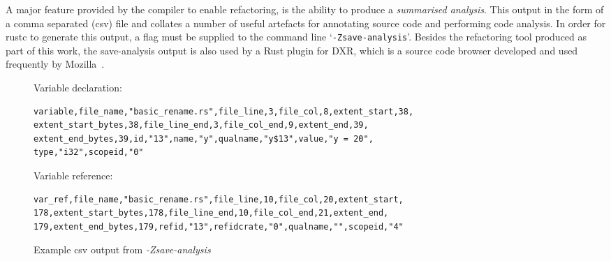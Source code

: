 %

A major feature provided by the compiler to enable refactoring, is the ability to produce a \textit{summarised analysis}. This output in the form of a comma separated (csv) file and collates a number of useful artefacts for annotating source code and performing code analysis. In order for rustc to generate this output, a flag must be supplied to the command line `{\verb|-Zsave-analysis|}'. Besides the refactoring tool produced as part of this work, the save-analysis output is also used by a Rust plugin for DXR, which is a source code browser developed and used frequently by Mozilla~\cite{dxr15}.  

\begin{figure*}
\vspace{5mm}
\noindent
Variable declaration:
\begin{verbatim}
variable,file_name,"basic_rename.rs",file_line,3,file_col,8,extent_start,38,
extent_start_bytes,38,file_line_end,3,file_col_end,9,extent_end,39,
extent_end_bytes,39,id,"13",name,"y",qualname,"y$13",value,"y = 20",
type,"i32",scopeid,"0"
\end{verbatim}

\noindent
Variable reference:
\begin{verbatim}
var_ref,file_name,"basic_rename.rs",file_line,10,file_col,20,extent_start,
178,extent_start_bytes,178,file_line_end,10,file_col_end,21,extent_end,
179,extent_end_bytes,179,refid,"13",refidcrate,"0",qualname,"",scopeid,"4"
\end{verbatim}

\caption{Example csv output from \emph{-Zsave-analysis}}
\label{Fig:csv}
\end{figure*}

